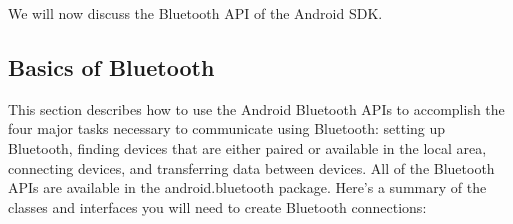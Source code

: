\documentclass[11pt]{report}
\begin{document}
We will now discuss the Bluetooth API of the Android SDK.
 
\subsection{Basics of Bluetooth} 

This section describes how to use the Android Bluetooth APIs to accomplish the four major tasks necessary to communicate using Bluetooth: setting up Bluetooth, finding devices that are either paired or available in the local area, connecting devices, and transferring data between devices.
All of the Bluetooth APIs are available in the android.bluetooth package. Here's a summary of the classes and interfaces you will need to create Bluetooth connections:
\begin{enumerate}


\end{enumerate}
\end{document}
